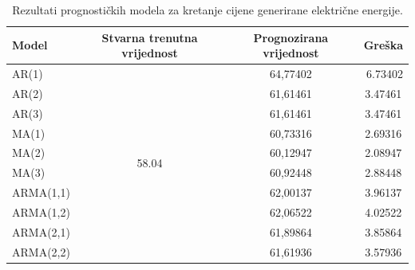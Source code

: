 \documentclass[a4paper,12pt,oneside]{memoir}
\begin{document}
        \hfill

        \begin{table}[H]
            \centering
            \caption{Rezultati prognostičkih modela za kretanje cijene generirane električne energije.}
            \renewcommand{\arraystretch}{2}
            \begin{tabular}{|l|c|c|c|}
                \hline
                \textbf{Model} & \textbf{Stvarna trenutna vrijednost} & \textbf{Prognozirana vrijednost} & \multicolumn{1}{r|}{\textbf{Greška}} \\ \hline
                AR(1)          & \multirow{10}{*}{58.04}              & 64,77402                         & \multicolumn{1}{r|}{6.73402}         \\ \cline{1-1} \cline{3-4} 
                AR(2)          &                                      & 61,61461                         & 3.47461                              \\ \cline{1-1} \cline{3-4} 
                AR(3)          &                                      & 61,61461                         & 3.47461                              \\ \cline{1-1} \cline{3-4} 
                MA(1)          &                                      & 60,73316                         & 2.69316                              \\ \cline{1-1} \cline{3-4} 
                MA(2)          &                                      & 60,12947                         & 2.08947                              \\ \cline{1-1} \cline{3-4} 
                MA(3)          &                                      & 60,92448                         & 2.88448                              \\ \cline{1-1} \cline{3-4} 
                ARMA(1,1)      &                                      & 62,00137                         & 3.96137                              \\ \cline{1-1} \cline{3-4} 
                ARMA(1,2)      &                                      & 62,06522                         & 4.02522                              \\ \cline{1-1} \cline{3-4} 
                ARMA(2,1)      &                                      & 61,89864                         & 3.85864                              \\ \cline{1-1} \cline{3-4} 
                ARMA(2,2)      &                                      & 61,61936                         & 3.57936                              \\ \hline
            \end{tabular}
            \renewcommand{\arraystretch}{1}
            \label{tab:price}
        \end{table}
\end{document}
